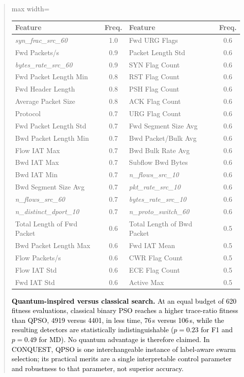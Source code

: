 \documentclass[11pt]{article}
\newenvironment{excerpt}{\begin{quote}\sloppy}{\end{quote}}
\begin{document}
\begin{excerpt}
\begin{table}[H]
\color{red}
\setlength{\tabcolsep}{2.5pt}
\renewcommand{\arraystretch}{1.02}
\begin{adjustbox}{max width=\linewidth}
\begin{tabular}{>{\raggedright\arraybackslash}p{3.0cm}c >{\raggedright\arraybackslash}p{3.0cm}c}
\hline\toprule
Feature & Freq. & Feature & Freq. \\
\hline\toprule
\textit{syn\_frac\_src\_60} & 1.0 & Fwd URG Flags & 0.6 \\
Fwd Packets/\allowbreak s & 0.9 & Packet Length Std & 0.6 \\
\textit{bytes\_rate\_src\_60} & 0.9 & SYN Flag Count & 0.6 \\
Fwd Packet Length Min & 0.8 & RST Flag Count & 0.6 \\
Fwd Header Length & 0.8 & PSH Flag Count & 0.6 \\
Average Packet Size & 0.8 & ACK Flag Count & 0.6 \\
Protocol & 0.7 & URG Flag Count & 0.6 \\
Fwd Packet Length Std & 0.7 & Fwd Segment Size Avg & 0.6 \\
Bwd Packet Length Min & 0.7 & Bwd Packet/\allowbreak Bulk Avg & 0.6 \\
Flow IAT Max & 0.7 & Bwd Bulk Rate Avg & 0.6 \\
Bwd IAT Max & 0.7 & Subflow Bwd Bytes & 0.6 \\
Bwd IAT Min & 0.7 & \textit{n\_flows\_src\_10} & 0.6 \\
Bwd Segment Size Avg & 0.7 & \textit{pkt\_rate\_src\_10} & 0.6 \\
\textit{n\_flows\_src\_60} & 0.7 & \textit{bytes\_rate\_src\_10} & 0.6 \\
\textit{n\_distinct\_dport\_10} & 0.7 & \textit{n\_proto\_switch\_60} & 0.6 \\
Total Length of Fwd Packet & 0.6 & Total Length of Bwd Packet & 0.5 \\
Bwd Packet Length Max & 0.6 & Fwd IAT Mean & 0.5 \\
Flow Packets/\allowbreak s & 0.6 & CWR Flag Count & 0.5 \\
Flow IAT Std & 0.6 & ECE Flag Count & 0.5 \\
Fwd IAT Std & 0.6 & Active Max & 0.5 \\
\hline\toprule
\end{tabular}
\end{adjustbox}
\end{table}

\textcolor{black}{\textbf{Quantum-inspired versus classical
search.} At an equal budget of 620 fitness evaluations, classical
binary PSO reaches a higher trace-ratio fitness than QPSO, 4919
versus 4401, in less time, 76\,s versus 106\,s, while the resulting
detectors are statistically indistinguishable ($p=0.23$ for F1 and
$p=0.49$ for MD). No quantum advantage is therefore claimed. In
CONQUEST, QPSO is one interchangeable instance of label-aware swarm
selection; its practical merits are a single interpretable control
parameter and robustness to that parameter, not superior accuracy.}


\end{excerpt}
\end{document}
